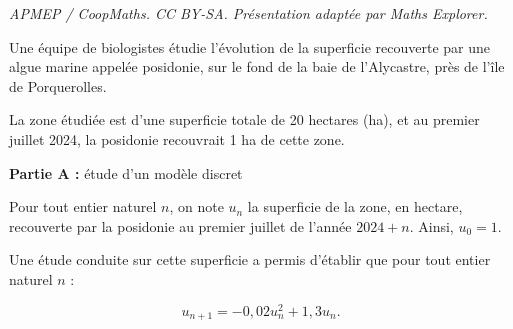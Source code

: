 \documentclass[10pt]{article}
\begin{document}
\noindent\textit{APMEP / CoopMaths. CC BY-SA. Présentation adaptée par Maths Explorer.}\par\medskip
\medskip

Une équipe de biologistes étudie l'évolution de la superficie recouverte par une algue marine appelée posidonie, sur le fond de la baie de l'Alycastre, près de l'île de Porquerolles.

La zone étudiée est d'une superficie totale de 20 hectares (ha), et au premier juillet 2024, la posidonie recouvrait 1 ha de cette zone.

\begin{center}\textbf{Partie A :} étude d'un modèle discret\end{center}

Pour tout entier naturel $n$, on note $u_n$ la superficie de la zone, en hectare, recouverte
par la posidonie au premier juillet de l'année $2024 + n$. Ainsi, $u_0 = 1$.

\smallskip

Une étude conduite sur cette superficie a permis d'établir que pour tout entier
naturel $n$ :

\[u_{n+1} = - 0,02u_n^2 + 1,3u_n.\]

\smallskip
\end{document}
